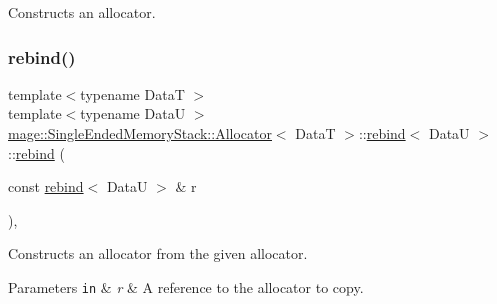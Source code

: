 Constructs an allocator. \hypertarget{structmage_1_1_single_ended_memory_stack_1_1_allocator_1_1rebind_af8761e57c718fe852e4b36e897a28534}{}\label{structmage_1_1_single_ended_memory_stack_1_1_allocator_1_1rebind_af8761e57c718fe852e4b36e897a28534} 
\subsubsection{\texorpdfstring{rebind()}{rebind()}\hspace{0.1cm}{\footnotesize\ttfamily [2/3]}}
{\footnotesize\ttfamily template$<$typename DataT $>$ \\
template$<$typename DataU $>$ \\
\hyperlink{structmage_1_1_single_ended_memory_stack_1_1_allocator}{mage\+::\+Single\+Ended\+Memory\+Stack\+::\+Allocator}$<$ DataT $>$\+::\hyperlink{structmage_1_1_single_ended_memory_stack_1_1_allocator_1_1rebind}{rebind}$<$ DataU $>$\+::\hyperlink{structmage_1_1_single_ended_memory_stack_1_1_allocator_1_1rebind}{rebind} (\begin{DoxyParamCaption}\item[{const \hyperlink{structmage_1_1_single_ended_memory_stack_1_1_allocator_1_1rebind}{rebind}$<$ DataU $>$ \&}]{r }\end{DoxyParamCaption})\hspace{0.3cm}{\ttfamily [private]}, {\ttfamily [delete]}}

Constructs an allocator from the given allocator.


\begin{DoxyParams}[1]{Parameters}
\mbox{\tt in}  & {\em r} & A reference to the allocator to copy. \\
\hline
\end{DoxyParams}
\hypertarget{structmage_1_1_single_ended_memory_stack_1_1_allocator_1_1rebind_a7101dfb156adee57b41648a4ab96e3a4}{}\label{structmage_1_1_single_ended_memory_stack_1_1_allocator_1_1rebind_a7101dfb156adee57b41648a4ab96e3a4} 
